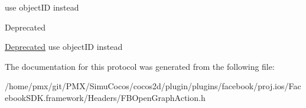 use object\+ID instead \begin{DoxyRefDesc}{Deprecated}
\item[\hyperlink{deprecated__deprecated000208}{Deprecated}]use object\+ID instead \end{DoxyRefDesc}


The documentation for this protocol was generated from the following file\+:\begin{DoxyCompactItemize}
\item 
/home/pmx/git/\+P\+M\+X/\+Simu\+Cocos/cocos2d/plugin/plugins/facebook/proj.\+ios/\+Facebook\+S\+D\+K.\+framework/\+Headers/F\+B\+Open\+Graph\+Action.\+h\end{DoxyCompactItemize}
